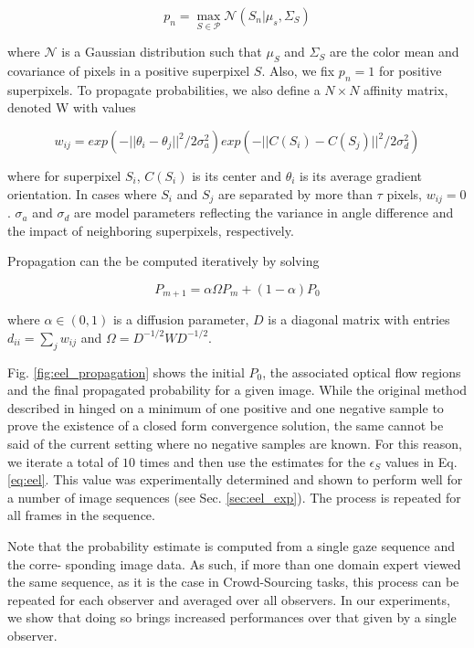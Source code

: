\begin{equation}
  p_{n} = \max_{S \in \mathcal{P}} \mathcal{N}(S_{n}|\mu_{s},\Sigma_{S})
  \end{equation}

  where $\mathcal{N}$ is a Gaussian distribution such that $\mu_{S}$ and $\Sigma_{S}$ are the color mean and covariance of pixels in a positive superpixel $S$.
  Also, we fix $p_{n}=1$ for positive superpixels.
  To propagate probabilities, we also define a $N \times N$ affinity matrix, denoted W
with values

\begin{equation}
w_{ij} = exp(-||\theta_{i} - \theta_{j}||^2 / 2\sigma_{a}^{2}) exp(-||C(S_i) - C(S_j)||^2 / 2\sigma_{d}^{2})
\end{equation}

where for superpixel $S_{i}$, $C(S_{i})$ is its center and $\theta_{i}$ is its average gradient orientation.
In cases where $S_{i}$ and $S_{j}$ are separated by more than $\tau$ pixels, $w_{ij}=0$.
$\sigma_{a}$ and $\sigma_{d}$ are model parameters reflecting the variance in angle difference and the impact of neighboring superpixels, respectively.

Propagation can the be computed iteratively by solving

\begin{equation}
P_{m+1} = \alpha \Omega P_{m} + (1 - \alpha)P_{0}
\end{equation}

where $\alpha \in (0,1)$ is a diffusion parameter, $D$ is a diagonal matrix with entries $d_{ii}=\sum_{j}w_{ij}$ and $\Omega = D^{-1/2} W D^{-1/2}$.

Fig. \ref{fig:eel_propagation} shows the initial $P_{0}$, the associated optical flow regions and the final propagated probability for a given image.
While the original method described in \cite{zhou04} hinged on a minimum of one positive and one negative sample to prove the existence of a closed form convergence solution, the same cannot be said of the current setting where no negative samples are known.
For this reason, we iterate a total of $10$ times and then use the estimates for the $\epsilon_{S}$
values in Eq. \ref{eq:eel}.
This value was experimentally determined and shown to perform well for a
number of image sequences (see Sec. \ref{sec:eel_exp}).
The process is repeated for all frames in the sequence.

Note that the probability estimate is computed from a single gaze sequence and the corre-
sponding image data. As such, if more than one domain expert viewed the same sequence, as it
is the case in Crowd-Sourcing tasks, this process can be repeated for each observer and averaged
over all observers.
In our experiments, we show that doing so brings increased performances over that given by a single observer.

